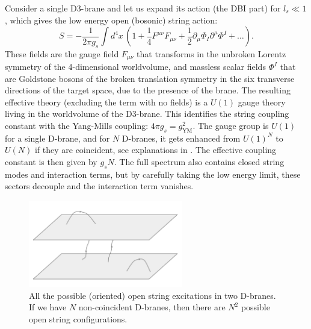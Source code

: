 Consider a single D3-brane and let us expand its action (the DBI part) for $l_s \ll 1$, 
which gives the low energy open (bosonic) string action:
\begin{equation}
 S = - \dfrac{1}{2 \pi g_s} \int d^{4}x \, (1+\dfrac{1}{4} F^{\mu \nu} F_{\mu \nu} 
     + \dfrac{1}{2} \partial_\mu \Phi_I \partial^{\mu} \Phi^I +\ldots). %
\end{equation}
These fields are the gauge field $F_{\mu \nu}$ that transforms in the unbroken Lorentz symmetry of the 4-dimensional worldvolume,
and massless scalar fields $\Phi^I$  that are Goldstone bosons of the broken translation symmetry in the six transverse directions of the target space,
due to the presence of the brane. 
The resulting effective theory (excluding the term with no fields) is a $U(1)$ gauge theory living in the worldvolume of the D3-brane.
This identifies the string coupling constant with the Yang-Mills coupling: $4 \pi g_s = g_\text{YM}^2$.
The gauge group is $U(1)$ for a single D-brane, and for $N$ D-branes, 
it gets enhanced from $U(1)^N$ to $U(N)$ if they are coincident, see explanations in \cite{Wulff:2007vj}.
The effective coupling constant is then given by $g_s N$.
The full spectrum also contains closed string modes and interaction terms, 
but by carefully taking the low energy limit, these sectors decouple and the interaction term vanishes.

\begin{figure}[t]
\begin{center}
\includegraphics[width=0.6\textwidth]{Images/2Dbranes.pdf}
\end{center}
\caption{\label{fig:2Dbranes} All the possible (oriented) open string excitations in two D-branes. 
If we have $N$ non-coincident D-branes, then there are $N^2$ possible open string configurations.}
\end{figure}


